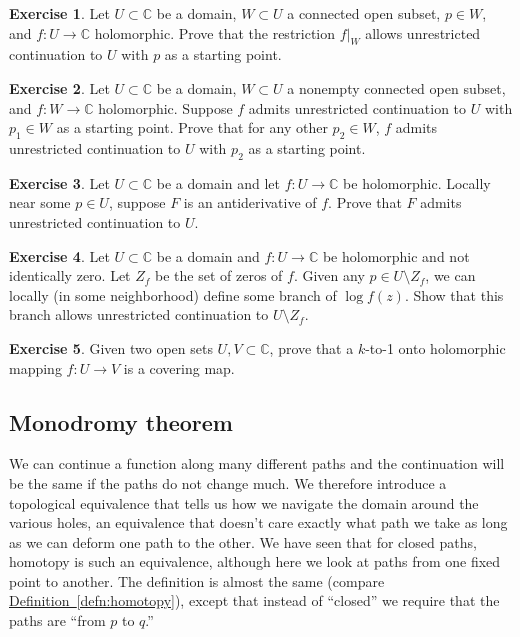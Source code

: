 \documentclass[12pt,openany]{book}
\newcommand{\C}{{\mathbb{C}}}
\newcommand{\myquote}[1]{``#1''}
\theoremstyle{plain}
\theoremstyle{remark}
\theoremstyle{definition}
\newenvironment{exbox}{%
    \def\FrameCommand{\vrule width 1pt \relax\hspace{10pt}}%
    \MakeFramed{\advance\hsize-\width\FrameRestore}%
}{%
    \endMakeFramed
}
\theoremstyle{exercise}
\newtheorem{exercise}{Exercise}[section]
\theoremstyle{example}
\newcommand{\defnref}[1]{\hyperref[#1]{Definition~\ref*{#1}}}
\begin{document}
\begin{exbox}
\begin{exercise}
Let $U \subset \C$ be a domain, $W \subset U$ a connected open subset,
$p \in W$, and $f \colon U \to \C$ holomorphic.  Prove that the restriction
$f|_W$ allows unrestricted continuation to $U$ with $p$ as a starting point.
\end{exercise}

\begin{exercise}%
\label{exercise:startingpointcont}
Let $U \subset \C$ be a domain, $W \subset U$ a nonempty connected open subset,
and $f \colon W \to \C$ holomorphic.  Suppose $f$ admits unrestricted
continuation to $U$ with $p_1 \in W$ as a starting point.  Prove
that for any other $p_2 \in W$, $f$ admits unrestricted continuation
to $U$ with $p_2$ as a starting point.
\end{exercise}

\begin{exercise}
Let $U \subset \C$ be a domain and let
$f \colon U \to \C$ be holomorphic.  Locally near some $p \in U$,
suppose $F$ is an antiderivative of $f$.  Prove that $F$ admits unrestricted
continuation to $U$.
\end{exercise}

\begin{exercise}
Let $U \subset \C$ be a domain and $f \colon U \to \C$ be holomorphic and
not identically zero.  Let $Z_f$ be the set of zeros of $f$.  Given any $p
\in U \setminus Z_f$, we can locally (in some neighborhood) define some branch of $\log f(z)$.
Show that this branch allows unrestricted continuation to $U \setminus Z_f$.
\end{exercise}

\begin{exercise}
Given two open sets $U,V \subset \C$,
prove that a $k$-to-1 onto holomorphic mapping $f \colon U \to V$ is a covering map.
\end{exercise}
\end{exbox}

\subsection{Monodromy theorem}

We can continue a function along many different paths and the continuation
will be the same if the paths do not change much.  We therefore 
introduce a topological equivalence that tells us how we navigate the domain
around the various holes, an equivalence that doesn't care exactly what
path we take as long as we can deform one path to the other.
We have seen that for closed paths, homotopy is such an equivalence, although
here we look at paths from one fixed point to another.  The definition
is almost the same (compare \defnref{defn:homotopy}), except that instead of
\myquote{closed} we require that the paths
are \myquote{from $p$ to $q$.}
\end{document}
